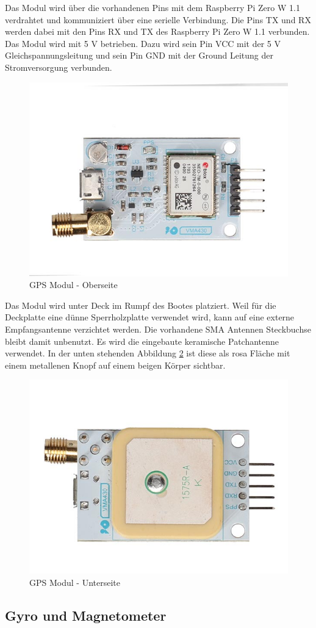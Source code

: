 Das Modul wird über die vorhandenen Pins mit dem Raspberry Pi Zero W 1.1 verdrahtet und kommuniziert über eine serielle Verbindung. Die Pins TX und RX werden dabei mit den Pins RX und TX des Raspberry Pi Zero W 1.1 verbunden. Das Modul wird mit 5 V betrieben. Dazu wird sein Pin VCC mit der 5 V Gleichspannungsleitung und sein Pin GND mit der Ground Leitung der Stromversorgung verbunden.
\begin{figure}[H]
    \centering
    \includegraphics[width=0.75\linewidth]{vma430_front-1.jpg}
    \caption{GPS Modul - Oberseite}
    \label{fig:enter-label}
\end{figure}
Das Modul wird unter Deck im Rumpf des Bootes platziert. Weil für die Deckplatte eine dünne Sperrholzplatte verwendet wird, kann auf eine externe Empfangsantenne verzichtet werden. Die vorhandene SMA Antennen Steckbuchse bleibt damit unbenutzt. Es wird die eingebaute keramische Patchantenne verwendet. In der unten stehenden Abbildung \ref{fig:GPS} ist diese als rosa Fläche mit einem metallenen Knopf auf einem beigen Körper sichtbar.
\begin{figure}[H]
    \centering
    \includegraphics[width=0.5\linewidth]{vma430_back-1.jpg}
    \caption{GPS Modul - Unterseite}
    \label{fig:GPS}
\end{figure}

\subsection{Gyro und Magnetometer}


